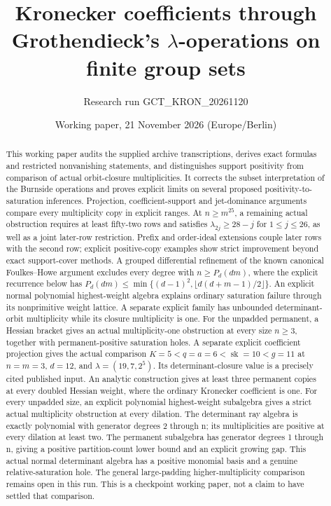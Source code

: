 \documentclass[11pt]{article}
\title{Kronecker coefficients through Grothendieck's\linebreak
\(\lambda\)-operations on finite group sets}
\author{Research run GCT\_KRON\_20261120}
\date{Working paper, 21 November 2026 (Europe/Berlin)}
\begin{document}
\maketitle
\begin{abstract}
This working paper audits the supplied archive transcriptions, derives
exact formulas and restricted nonvanishing statements, and distinguishes
support positivity from comparison of actual orbit-closure multiplicities.
It corrects the subset interpretation of the Burnside operations and proves
explicit limits on several proposed positivity-to-saturation inferences.
Projection, coefficient-support and jet-dominance arguments compare every
multiplicity copy in explicit ranges. At \(n\geq m^{25}\), a remaining
actual obstruction requires at least fifty-two rows and satisfies
\(\lambda_{2j}\geq28-j\) for \(1\leq j\leq26\), as well as a
joint later-row restriction. Prefix and order-ideal extensions couple
later rows with the second row; explicit positive-copy examples show
strict improvement beyond exact support-cover methods. A grouped differential refinement of the
known canonical Foulkes--Howe argument excludes every degree with
\(n\geq P_d(dm)\), where the explicit recurrence below has
\(P_d(dm)\leq\min\{(d-1)^2,\lfloor d(d+m-1)/2\rfloor\}\).
An explicit normal polynomial highest-weight algebra explains ordinary
saturation failure through its nonprimitive weight lattice. A separate
explicit family has unbounded determinant-orbit multiplicity while its
closure multiplicity is one. For the unpadded permanent, a Hessian
bracket gives an actual multiplicity-one obstruction at every size
\(n\geq3\), together with permanent-positive saturation holes.
A separate explicit coefficient projection gives the actual comparison
\(K=5<q=a=6<\operatorname{sk}=10<g=11\) at
\(n=m=3\), \(d=12\), and \(\lambda=(19,7,2^5)\).
Its determinant-closure value is a precisely cited published input.
An analytic construction gives at least three permanent copies at every
doubled Hessian weight, where the ordinary Kronecker coefficient is one.
For every unpadded size, an explicit polynomial highest-weight subalgebra
gives a strict actual multiplicity obstruction at every dilation. The
determinant ray algebra is exactly polynomial with generator degrees
2 through n; its multiplicities are positive at every dilation at least
two. The permanent subalgebra has generator degrees 1 through n, giving
a positive partition-count lower bound and an explicit growing gap.
This actual normal determinant algebra has a positive monomial basis
and a genuine relative-saturation hole.
The general large-padding
higher-multiplicity comparison remains open in this run. This is a
checkpoint working paper, not a claim to have settled that comparison.
\end{abstract}
\end{document}
